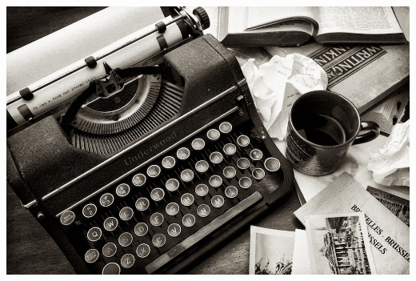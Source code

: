 	\begin{Figure}
	 \centering
	 \includegraphics[width=\linewidth]{images/Journalism}
	 \label{Typewriter}
	\end{Figure}


